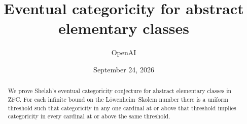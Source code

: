 \documentclass[11pt]{article}
\title{Eventual categoricity for abstract elementary classes}
\author{OpenAI}
\date{September 24, 2026}
\theoremstyle{definition}
\theoremstyle{remark}
\begin{document}
\maketitle
\begin{abstract}
We prove Shelah's eventual categoricity conjecture for abstract elementary
classes in ZFC. For each infinite bound on the L\"owenheim--Skolem number
there is a uniform threshold such that categoricity in any one cardinal
at or above that threshold implies categoricity in every cardinal at or
above the same threshold.
\end{abstract}
\tableofcontents
\clearpage
















\end{document}
